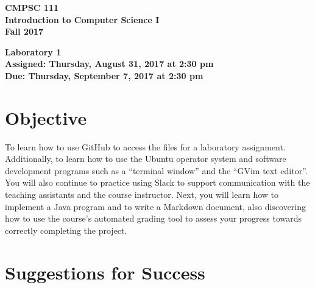 \documentclass[11pt]{article}
\newcommand{\assignmentduedate}{September 7}
\newcommand{\assignmentassignedate}{August 31}
\newcommand{\labyear}{2017}
\newcommand{\labday}{Thursday}
\newcommand{\labtime}{2:30 pm}
\newcommand{\assigneddate}{Assigned: \labday, \assignmentassignedate, \labyear{} at \labtime{}}
\newcommand{\duedate}{Due: \labday, \assignmentduedate, \labyear{} at \labtime{}}
\newcommand{\labtitle}[1]
{
  \begin{center}
    \begin{center}
      \bf
      CMPSC 111\\Introduction to Computer Science I\\
      Fall 2017\\
      \medskip
    \end{center}
    \bf
    #1
  \end{center}
}
\begin{document}
\thispagestyle{empty}

\labtitle{Laboratory 1 \\ \assigneddate{} \\ \duedate{}}

\section*{Objective}

To learn how to use GitHub to access the files for a laboratory assignment. Additionally, to learn how to use the Ubuntu
operator system and software development programs such as a ``terminal window'' and the ``GVim text editor''. You will
also continue to practice using Slack to support communication with the teaching assistants and the course instructor.
Next, you will learn how to implement a Java program and to write a Markdown document, also discovering how to use the
course's automated grading tool to assess your progress towards correctly completing the project.

\section*{Suggestions for Success}
\end{document}

